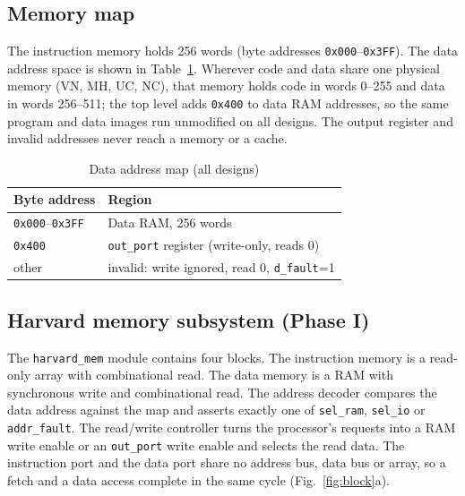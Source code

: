 \documentclass[conference]{IEEEtran}
\begin{document}
\subsection{Memory map}
The instruction memory holds 256 words (byte addresses \texttt{0x000}--\texttt{0x3FF}).
The data address space is shown in Table~\ref{tab:map}. Wherever code and
data share one physical memory (VN, MH, UC, NC), that memory holds code in
words 0--255 and data in words 256--511; the top level adds \texttt{0x400} to
data RAM addresses, so the same program and data images run unmodified on all
designs. The output register and invalid addresses never reach a memory or a
cache.

\begin{table}[t]
\caption{Data address map (all designs)}
\label{tab:map}
\centering
\begin{tabular}{ll}
\toprule
Byte address & Region \\
\midrule
\texttt{0x000}--\texttt{0x3FF} & Data RAM, 256 words \\
\texttt{0x400} & \texttt{out\_port} register (write-only, reads 0) \\
other & invalid: write ignored, read 0, \texttt{d\_fault}=1 \\
\bottomrule
\end{tabular}
\end{table}

\subsection{Harvard memory subsystem (Phase I)}
The \texttt{harvard\_mem} module contains four blocks. The instruction memory
is a read-only array with combinational read. The data memory is a RAM with
synchronous write and combinational read. The address decoder compares the
data address against the map and asserts exactly one of \texttt{sel\_ram},
\texttt{sel\_io} or \texttt{addr\_fault}. The read/write controller turns the
processor's requests into a RAM write enable or an \texttt{out\_port} write
enable and selects the read data. The instruction port and the data port
share no address bus, data bus or array, so a fetch and a data access
complete in the same cycle (Fig.~\ref{fig:block}a).
\end{document}
